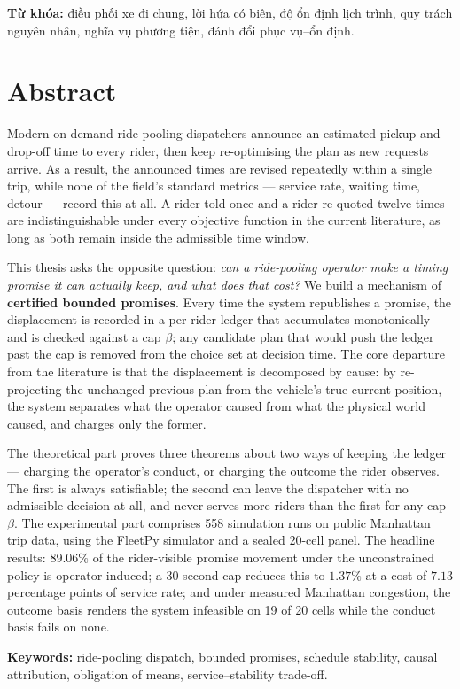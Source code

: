 \vspace{6pt}
\noindent\textbf{Từ khóa:} điều phối xe đi chung, lời hứa có biên, độ ổn định lịch trình,
quy trách nguyên nhân, nghĩa vụ phương tiện, đánh đổi phục vụ--ổn định.

\clearpage

\chapter*{Abstract}

Modern on-demand ride-pooling dispatchers announce an estimated pickup and drop-off time to
every rider, then keep re-optimising the plan as new requests arrive. As a result, the
announced times are revised repeatedly within a single trip, while none of the field's
standard metrics --- service rate, waiting time, detour --- record this at all. A rider told
once and a rider re-quoted twelve times are indistinguishable under every objective function
in the current literature, as long as both remain inside the admissible time window.

This thesis asks the opposite question: \emph{can a ride-pooling operator make a timing
promise it can actually keep, and what does that cost?} We build a mechanism of
\textbf{certified bounded promises}. Every time the system republishes a promise, the
displacement is recorded in a per-rider ledger that accumulates monotonically and is checked
against a cap $\beta$; any candidate plan that would push the ledger past the cap is removed
from the choice set at decision time. The core departure from the literature is that the
displacement is decomposed by cause: by re-projecting the unchanged previous plan from the
vehicle's true current position, the system separates what the operator caused from what the
physical world caused, and charges only the former.

The theoretical part proves three theorems about two ways of keeping the ledger --- charging
the operator's conduct, or charging the outcome the rider observes. The first is always
satisfiable; the second can leave the dispatcher with no admissible decision at all, and never
serves more riders than the first for any cap $\beta$. The experimental part comprises 558
simulation runs on public Manhattan trip data, using the FleetPy simulator and a sealed
20-cell panel. The headline results: $89.06\%$ of the rider-visible promise movement under the
unconstrained policy is operator-induced; a 30-second cap reduces this to $1.37\%$ at a cost of
$7.13$ percentage points of service rate; and under measured Manhattan congestion, the
outcome basis renders the system infeasible on 19 of 20 cells while the conduct basis fails on
none.

\vspace{6pt}
\noindent\textbf{Keywords:} ride-pooling dispatch, bounded promises, schedule stability, causal
attribution, obligation of means, service--stability trade-off.

\clearpage
